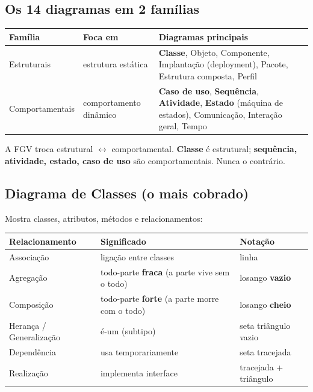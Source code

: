 \subsection{Os 14 diagramas em 2 famílias}

\begin{center}
\begin{tabular}{@{}p{2.6cm}p{2.6cm}p{6.4cm}@{}}
\toprule
\textbf{Família} & \textbf{Foca em} & \textbf{Diagramas principais} \\
\midrule
Estruturais & estrutura estática & \textbf{Classe}, Objeto, Componente, Implantação (deployment), Pacote, Estrutura composta, Perfil \\
Comportamentais & comportamento dinâmico & \textbf{Caso de uso}, \textbf{Sequência}, \textbf{Atividade}, \textbf{Estado} (máquina de estados), Comunicação, Interação geral, Tempo \\
\bottomrule
\end{tabular}
\end{center}

\begin{pegadinha}
A FGV troca estrutural $\leftrightarrow$ comportamental. \textbf{Classe} é
estrutural; \textbf{sequência, atividade, estado, caso de uso} são
comportamentais. Nunca o contrário.
\end{pegadinha}

\subsection{Diagrama de Classes (o mais cobrado)}

Mostra classes, atributos, métodos e relacionamentos:

\begin{center}
\begin{tabular}{@{}p{3.6cm}p{4.6cm}p{2.6cm}@{}}
\toprule
\textbf{Relacionamento} & \textbf{Significado} & \textbf{Notação} \\
\midrule
Associação & ligação entre classes & linha \\
Agregação & todo-parte \textbf{fraca} (a parte vive sem o todo) & losango \textbf{vazio} \\
Composição & todo-parte \textbf{forte} (a parte morre com o todo) & losango \textbf{cheio} \\
Herança / Generalização & é-um (subtipo) & seta triângulo vazio \\
Dependência & usa temporariamente & seta tracejada \\
Realização & implementa interface & tracejada + triângulo \\
\bottomrule
\end{tabular}
\end{center}


